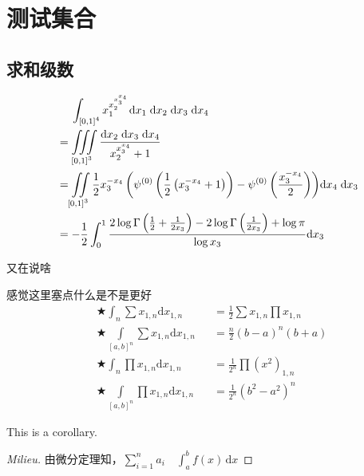 \chapter{测试集合}


\section{求和级数}
\begin{definition}[Milieu]
$$\begin{aligned}
  &\quad\;\int_{{{[0,1]}^4}} {x_1^{x_2^{x_3^{{x_4}}}}{\mkern 1mu} } {\text{d}}{x_1}\;{\text{d}}{x_2}\;{\text{d}}{x_3}\;{\text{d}}{x_4}\\
   &= \iiint\limits_{{{[0,1]}^3}} {\frac{{{\text{d}}{x_2}\;{\text{d}}{x_3}\;{\text{d}}{x_4}}}{{x_2^{x_3^{{x_4}}} + 1}}}\\
   &= \iint\limits_{{{[0,1]}^3}} {\frac{1}{2}x_3^{ - {x_4}}\left( {{\psi ^{(0)}}\left( {\frac{1}{2}\left( {x_3^{ - {x_4}} + 1} \right)} \right) - {\psi ^{(0)}}\left( {\frac{{x_3^{ - {x_4}}}}{2}} \right)} \right)}{\text{d}}{x_4}\;{\text{d}}{x_3}\\
   &=  - \frac{1}{2}\int_0^1 {\frac{{2\log \Gamma \left( {\frac{1}{2} + \frac{1}{{2{x_3}}}} \right) - 2\log \Gamma \left( {\frac{1}{{2{x_3}}}} \right) + \log \pi }}{{\log {x_3}}}} {\text{d}}{x_3}
\end{aligned} $$
\end{definition}

又在说啥
\begin{theorem}[Propagation]
感觉这里塞点什么是不是更好
$$\begin{aligned}
  &\bigstar\int_n {\sum {{x_{1,n}}} } {\text{d}}{x_{1,n}} &&= \frac{1}{2}\sum {{x_{1,n}}} \prod {{x_{1,n}}} \\
  &\bigstar\int\limits_{{{[a,b]}^n}} {\sum {{x_{1,n}}} } {\text{d}}{x_{1,n}} &&= \frac{n}{2}{(b - a)^n}(b + a)\\
  &\bigstar\int_n {\prod {{x_{1,n}}} } {\text{d}}{x_{1,n}} &&= \frac{1}{{{2^n}}}\prod {{{\left( {{x^2}} \right)}_{1,n}}} \\
  &\bigstar\int\limits_{{{[a,b]}^n}} {\prod {{x_{1,n}}} } {\text{d}}{x_{1,n}} &&= \frac{1}{{{2^n}}}{({b^2} - {a^2})^n}
\end{aligned}$$
\end{theorem}

\begin{lemma}[Milieu]
This is a corollary.
\end{lemma}


\begin{proof}[Milieu]
由微分定理知，$\sum_{i=1}^n a_i \quad \int_a^b f(x)\,\mathrm{d}x$
\end{proof}


